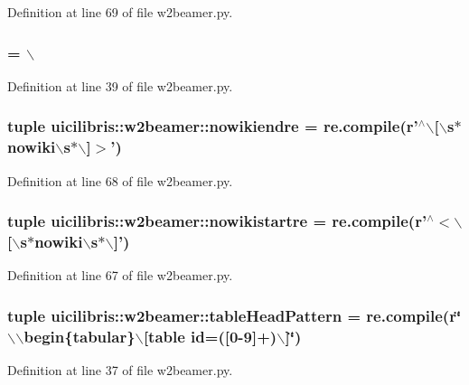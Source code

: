 \-Definition at line 69 of file w2beamer.\-py.

\hypertarget{namespaceuicilibris_1_1w2beamer_a20293542377aa84d3645ff8ca489dc25}{
\subsubsection[{lstbasicstyle}]{ = $\backslash$}}\label{namespaceuicilibris_1_1w2beamer_a20293542377aa84d3645ff8ca489dc25}


\-Definition at line 39 of file w2beamer.\-py.

\hypertarget{namespaceuicilibris_1_1w2beamer_a10aa1adbb79cef7023740fb735a22c97}{
\subsubsection[{nowikiendre}]{\setlength{\rightskip}{0pt plus 5cm}tuple {\bf uicilibris\-::w2beamer\-::nowikiendre} = re.\-compile(r'$^\wedge$$\backslash$\mbox{[}$\backslash$s$\ast$nowiki$\backslash$s$\ast$$\backslash$\mbox{]}$>$')}}\label{namespaceuicilibris_1_1w2beamer_a10aa1adbb79cef7023740fb735a22c97}


\-Definition at line 68 of file w2beamer.\-py.

\hypertarget{namespaceuicilibris_1_1w2beamer_ad51b396b118fa48819396baec8fcd981}{
\subsubsection[{nowikistartre}]{\setlength{\rightskip}{0pt plus 5cm}tuple {\bf uicilibris\-::w2beamer\-::nowikistartre} = re.\-compile(r'$^\wedge$$<$$\backslash$\mbox{[}$\backslash$s$\ast$nowiki$\backslash$s$\ast$$\backslash$\mbox{]}')}}\label{namespaceuicilibris_1_1w2beamer_ad51b396b118fa48819396baec8fcd981}


\-Definition at line 67 of file w2beamer.\-py.

\hypertarget{namespaceuicilibris_1_1w2beamer_a3f4c9d7ef11e43b61fbe6699a65b2c56}{
\subsubsection[{table\-Head\-Pattern}]{\setlength{\rightskip}{0pt plus 5cm}tuple {\bf uicilibris\-::w2beamer\-::table\-Head\-Pattern} = re.\-compile(r\char`\"{}$\backslash$$\backslash$begin\{tabular\}$\backslash$\mbox{[}table id=(\mbox{[}0-\/9\mbox{]}+)$\backslash$\mbox{]}\char`\"{})}}\label{namespaceuicilibris_1_1w2beamer_a3f4c9d7ef11e43b61fbe6699a65b2c56}


\-Definition at line 37 of file w2beamer.\-py.

